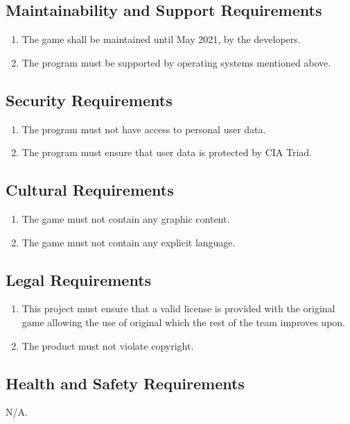\documentclass[12pt, titlepage]{article}
\begin{document}
\subsection{Maintainability and Support Requirements}

\begin{enumerate}[{MS}1. ]
    \item The game shall be maintained until May 2021, by the developers.
    \item The program must be supported by operating systems mentioned above.
\end{enumerate}

\subsection{Security Requirements}
\begin{enumerate}[{SR}1. ]
    \item The program must not have access to personal user data.
    \item The program must ensure that user data is protected by CIA Triad.
\end{enumerate}


\subsection{Cultural Requirements}
\begin{enumerate}[{CR}1. ]
    \item The game must not contain any graphic content.
    \item The game must not contain any explicit language.
\end{enumerate}

\subsection{Legal Requirements}
\begin{enumerate}[{L}1. ]
    \item This project must ensure that a valid license is provided with the original game allowing the use of original which the rest of the team improves upon.
    \item The product must not violate copyright.
\end{enumerate}

\subsection{Health and Safety Requirements}
N/A.
\end{document}

